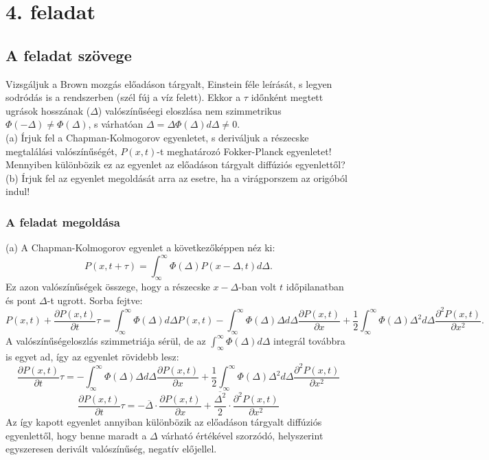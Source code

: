 \documentclass[12pt]{article}
\begin{document}
\section*{4. feladat}
\subsection*{A feladat szövege}
Vizsgáljuk a Brown mozgás előadáson tárgyalt, Einstein féle leírását, s legyen sodródás is a rendszerben (szél fúj a víz felett). Ekkor a $\tau$ időnként megtett ugrások hosszának ($\Delta$) valószínűséegi eloszlása nem szimmetrikus $\Phi(-\Delta) \neq \Phi(\Delta)$, s várhatóan $\Delta =   \Delta\Phi(\Delta)d\Delta\neq 0$.\\
(a) Írjuk fel a Chapman-Kolmogorov egyenletet, s deriváljuk a részecske megtalálási valószínűségét, $P (x, t)$-t meghatározó Fokker-Planck egyenletet! Mennyiben különbözik ez az egyenlet az előadáson tárgyalt diffúziós egyenlettől?
\\
(b) Írjuk fel az egyenlet megoldását arra az esetre, ha a virágporszem az origóból indul!
\subsubsection*{A feladat megoldása}
(a) A Chapman-Kolmogorov egyenlet a következőképpen néz ki:
$$P(x,t+\tau) = \int_{\infty}^{\infty}\Phi(\Delta)P(x-\Delta, t)d\Delta.$$
Ez azon valószínűségek összege, hogy a részecske $x-\Delta$-ban volt $t$ időpilanatban és pont $\Delta$-t ugrott. Sorba fejtve:
$$P(x,t)+\frac{\partial P(x,t)}{\partial t}\tau =\int_{\infty}^{\infty}\Phi(\Delta)d\Delta P(x,t) -\int_{\infty}^{\infty}\Phi(\Delta)\Delta d\Delta\frac{\partial P(x,t)}{\partial x} + \frac{1}{2}\int_{\infty}^{\infty}\Phi(\Delta)\Delta^2d\Delta\frac{\partial^2P(x,t)}{\partial x^2}  .$$
A valószínűségeloszlás szimmetriája sérül, de az $\int_{\infty}^{\infty}\Phi(\Delta)d\Delta$ integrál továbbra is egyet ad, így az egyenlet rövidebb lesz:
$$\frac{\partial P(x,t)}{\partial t}\tau = -\int_{\infty}^{\infty}\Phi(\Delta)\Delta d\Delta\frac{\partial P(x,t)}{\partial x} + \frac{1}{2}\int_{\infty}^{\infty}\Phi(\Delta)\Delta^2d\Delta\frac{\partial^2P(x,t)}{\partial x^2}$$
$$\frac{\partial P(x,t)}{\partial t}\tau = -\overline \Delta\cdot\frac{\partial P(x,t)}{\partial x} + \frac{\overline{\Delta ^2}}{2}\cdot\frac{\partial^2P(x,t)}{\partial x^2}$$
Az így kapott egyenlet annyiban különbözik az előadáson tárgyalt diffúziós egyenlettől, hogy benne maradt a $\Delta$ várható értékével szorzódó, helyszerint egyszeresen derivált valószínűség, negatív előjellel.
\end{document}

